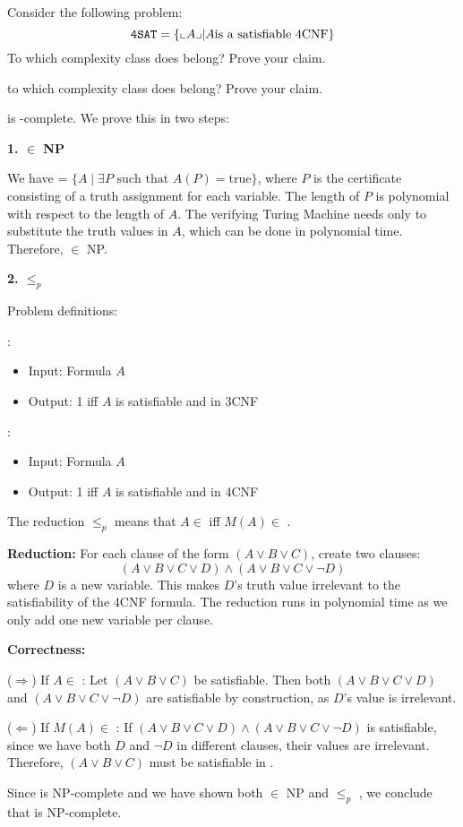\begin{ex}[kSAT{4}]
	Consider the following problem:
	\[
		\kSAT{4} = \{ \enc{A} | A \text{is a satisfiable 4CNF} \}
	\]
	To which complexity class does  belong? Prove your claim.

	to which complexity class does  belong? Prove your claim.
\end{ex}
\begin{solution}
	 is \NP-complete. We prove this in two steps:

	\textbf{1.  $\in$ NP}

	We have  = $\{A \mid \exists P \text{ such that } A(P)=\text{true}\}$, where $P$ is the certificate consisting of a truth assignment for each variable. The length of $P$ is polynomial with respect to the length of $A$. The verifying Turing Machine needs only to substitute the truth values in $A$, which can be done in polynomial time. Therefore,  $\in$ NP.

	\textbf{2.  $\leq_p$ }

	Problem definitions:

	:
	\begin{itemize}
		\item Input: Formula $A$
		\item Output: 1 iff $A$ is satisfiable and in 3CNF
	\end{itemize}

	:
	\begin{itemize}
		\item Input: Formula $A$
		\item Output: 1 iff $A$ is satisfiable and in 4CNF
	\end{itemize}

	The reduction  $\leq_p$  means that $A \in$  iff $M(A) \in$ .

	\textbf{Reduction:} For each clause of the form $(A \lor B \lor C)$, create two clauses:
	\[(A \lor B \lor C \lor D) \land (A \lor B \lor C \lor \neg D)\]
	where $D$ is a new variable. This makes $D$'s truth value irrelevant to the satisfiability of the 4CNF formula. The reduction runs in polynomial time as we only add one new variable per clause.

	\textbf{Correctness:}

	($\Rightarrow$) If $A \in$ : Let $(A \lor B \lor C)$ be satisfiable. Then both $(A \lor B \lor C \lor D)$ and $(A \lor B \lor C \lor \neg D)$ are satisfiable by construction, as $D$'s value is irrelevant.

	($\Leftarrow$) If $M(A) \in$ : If $(A \lor B \lor C \lor D) \land (A \lor B \lor C \lor \neg D)$ is satisfiable, since we have both $D$ and $\neg D$ in different clauses, their values are irrelevant. Therefore, $(A \lor B \lor C)$ must be satisfiable in .

	Since  is NP-complete and we have shown both  $\in$ NP and  $\leq_p$ , we conclude that  is NP-complete.
\end{solution}


